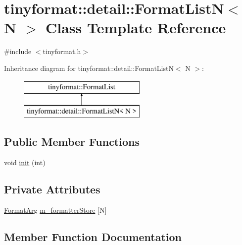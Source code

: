 \hypertarget{classtinyformat_1_1detail_1_1_format_list_n}{}\section{tinyformat\+:\+:detail\+:\+:Format\+ListN$<$ N $>$ Class Template Reference}
\label{classtinyformat_1_1detail_1_1_format_list_n}


{\ttfamily \#include $<$tinyformat.\+h$>$}

Inheritance diagram for tinyformat\+:\+:detail\+:\+:Format\+ListN$<$ N $>$\+:\begin{figure}[H]
\begin{center}
\leavevmode
\includegraphics[height=2.000000cm]{classtinyformat_1_1detail_1_1_format_list_n}
\end{center}
\end{figure}
\subsection*{Public Member Functions}
\begin{DoxyCompactItemize}
\item 
void \mbox{\hyperlink{classtinyformat_1_1detail_1_1_format_list_n_a78183c11bc8d7bb1e0e83cac78abc2d0}{init}} (int)
\end{DoxyCompactItemize}
\subsection*{Private Attributes}
\begin{DoxyCompactItemize}
\item 
\mbox{\hyperlink{classtinyformat_1_1detail_1_1_format_arg}{Format\+Arg}} \mbox{\hyperlink{classtinyformat_1_1detail_1_1_format_list_n_a34d9e64988d50f945f6bbef71429f35f}{m\+\_\+formatter\+Store}} \mbox{[}N\mbox{]}
\end{DoxyCompactItemize}


\subsection{Member Function Documentation}
\mbox{\label{classtinyformat_1_1detail_1_1_format_list_n_a78183c11bc8d7bb1e0e83cac78abc2d0}} 
